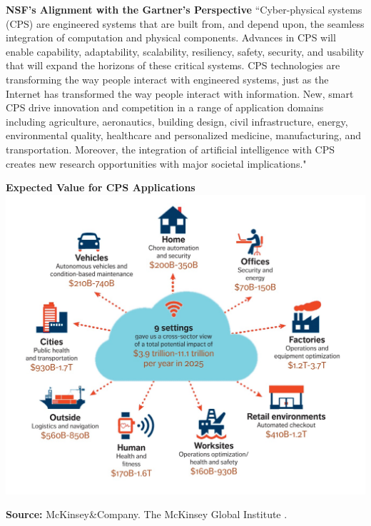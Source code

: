 \documentclass[aspectratio=43]{beamer}
\begin{document}
\begin{frame}{\textbf{NSF's Alignment with the Gartner's Perspective}}
            ``Cyber-physical systems (CPS) are engineered systems that are built from, and depend upon, the seamless integration of computation and physical components. Advances in CPS will enable capability, adaptability, scalability, resiliency, safety, security, and usability that will expand the horizons of these critical systems. CPS technologies are transforming the way people interact with engineered systems, just as the Internet has transformed the way people interact with information. New, smart CPS drive innovation and competition in a range of application domains including agriculture, aeronautics, building design, civil infrastructure, energy, environmental quality, healthcare and personalized medicine, manufacturing, and transportation. Moreover, the \textcolor{miamired}{integration of artificial intelligence with CPS creates new research opportunities with major societal implications.}" \cite{nsf2019cps}
\end{frame}

\begin{frame}{\textbf{Expected Value for CPS Applications}}
    \centering 
    \includegraphics[width=\textwidth, height= 0.77\textheight, keepaspectratio, frame]{Figures/McKinsey-Global-Institute_IoT.jpg} 
    
    \tiny{\textbf{Source:} McKinsey\&Company. The McKinsey Global Institute \cite{mckinsey2015}.}
 
\end{frame}
\end{document}

